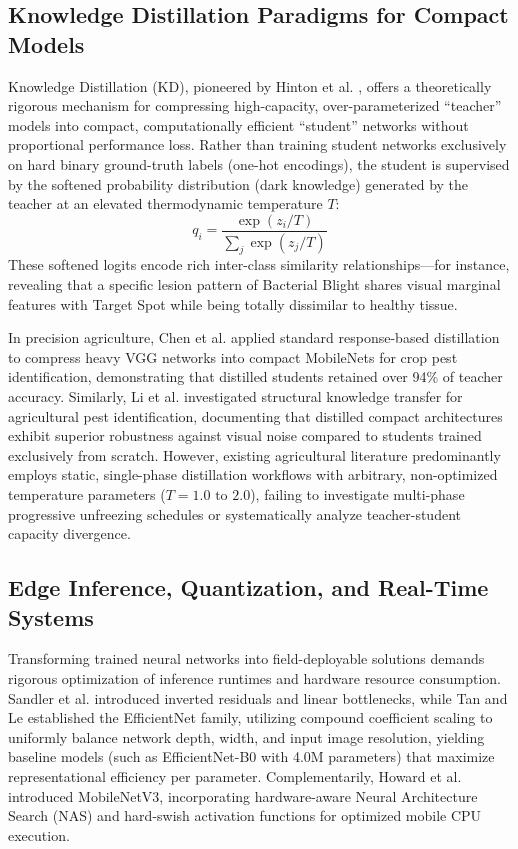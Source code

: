 \documentclass[journal,10pt,twocolumn]{IEEEtran}
\begin{document}
\subsection{Knowledge Distillation Paradigms for Compact Models}
Knowledge Distillation (KD), pioneered by Hinton et al. \cite{hinton2015distilling}, offers a theoretically rigorous mechanism for compressing high-capacity, over-parameterized ``teacher'' models into compact, computationally efficient ``student'' networks without proportional performance loss. Rather than training student networks exclusively on hard binary ground-truth labels (one-hot encodings), the student is supervised by the softened probability distribution (dark knowledge) generated by the teacher at an elevated thermodynamic temperature $T$:
\begin{equation}
q_i = \frac{\exp(z_i / T)}{\sum_j \exp(z_j / T)}
\end{equation}
These softened logits encode rich inter-class similarity relationships---for instance, revealing that a specific lesion pattern of Bacterial Blight shares visual marginal features with Target Spot while being totally dissimilar to healthy tissue.

In precision agriculture, Chen et al. \cite{chen2020using} applied standard response-based distillation to compress heavy VGG networks into compact MobileNets for crop pest identification, demonstrating that distilled students retained over 94\% of teacher accuracy. Similarly, Li et al. \cite{li2022lightweight} investigated structural knowledge transfer for agricultural pest identification, documenting that distilled compact architectures exhibit superior robustness against visual noise compared to students trained exclusively from scratch. However, existing agricultural literature predominantly employs static, single-phase distillation workflows with arbitrary, non-optimized temperature parameters ($T=1.0 \text{ to } 2.0$), failing to investigate multi-phase progressive unfreezing schedules or systematically analyze teacher-student capacity divergence.

\subsection{Edge Inference, Quantization, and Real-Time Systems}
Transforming trained neural networks into field-deployable solutions demands rigorous optimization of inference runtimes and hardware resource consumption. Sandler et al. \cite{sandler2018mobilenetv2} introduced inverted residuals and linear bottlenecks, while Tan and Le \cite{tan2019efficientnet} established the EfficientNet family, utilizing compound coefficient scaling to uniformly balance network depth, width, and input image resolution, yielding baseline models (such as EfficientNet-B0 with 4.0M parameters) that maximize representational efficiency per parameter. Complementarily, Howard et al. \cite{howard2019searching} introduced MobileNetV3, incorporating hardware-aware Neural Architecture Search (NAS) and hard-swish activation functions for optimized mobile CPU execution.
\end{document}
